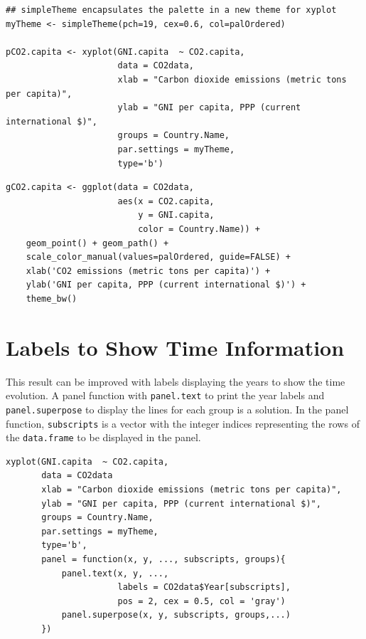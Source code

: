 \documentclass[smallroyalvopaper]{memoir}
\begin{document}
\lstset{language=r,label= ,caption= ,captionpos=b,numbers=none}
\begin{lstlisting}
## simpleTheme encapsulates the palette in a new theme for xyplot
myTheme <- simpleTheme(pch=19, cex=0.6, col=palOrdered)

pCO2.capita <- xyplot(GNI.capita  ~ CO2.capita,
                      data = CO2data,
                      xlab = "Carbon dioxide emissions (metric tons per capita)",
                      ylab = "GNI per capita, PPP (current international $)",
                      groups = Country.Name,
                      par.settings = myTheme,
                      type='b')
\end{lstlisting}

\lstset{language=r,label= ,caption= ,captionpos=b,numbers=none}
\begin{lstlisting}
gCO2.capita <- ggplot(data = CO2data,
                      aes(x = CO2.capita,
                          y = GNI.capita,
                          color = Country.Name)) +
    geom_point() + geom_path() +
    scale_color_manual(values=palOrdered, guide=FALSE) +
    xlab('CO2 emissions (metric tons per capita)') +
    ylab('GNI per capita, PPP (current international $)') +
    theme_bw()
\end{lstlisting}

\section{Labels to Show Time Information}
\label{sec:org8215fc3}
This result can be improved with labels displaying the years to show
the time evolution.  A panel function with \texttt{panel.text} to print the
year labels and \texttt{panel.superpose} to display the lines for each group
is a solution. In the panel function, \texttt{subscripts} is a vector with
the integer indices representing the rows of the \texttt{data.frame} to be
displayed in the panel.



\lstset{language=r,label= ,caption= ,captionpos=b,numbers=none}
\begin{lstlisting}
xyplot(GNI.capita  ~ CO2.capita,
       data = CO2data
       xlab = "Carbon dioxide emissions (metric tons per capita)",
       ylab = "GNI per capita, PPP (current international $)",
       groups = Country.Name,
       par.settings = myTheme,
       type='b',
       panel = function(x, y, ..., subscripts, groups){
           panel.text(x, y, ...,
                      labels = CO2data$Year[subscripts],
                      pos = 2, cex = 0.5, col = 'gray')
           panel.superpose(x, y, subscripts, groups,...)
       })
\end{lstlisting}
\end{document}

